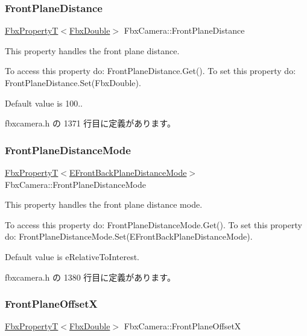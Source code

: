 \subsubsection{\texorpdfstring{Front\+Plane\+Distance}{FrontPlaneDistance}}
{\footnotesize\ttfamily \hyperlink{class_fbx_property_t}{Fbx\+PropertyT}$<$\hyperlink{fbxtypes_8h_a171e72a1c46fc15c1a6c9c31948c1c5b}{Fbx\+Double}$>$ Fbx\+Camera\+::\+Front\+Plane\+Distance}

This property handles the front plane distance.

To access this property do\+: Front\+Plane\+Distance.\+Get(). To set this property do\+: Front\+Plane\+Distance.\+Set(\+Fbx\+Double).

Default value is 100.. 

 fbxcamera.\+h の 1371 行目に定義があります。

\mbox{\label{class_fbx_camera_ac8275a3d73371ebdd381bec957820b14}} 
\subsubsection{\texorpdfstring{Front\+Plane\+Distance\+Mode}{FrontPlaneDistanceMode}}
{\footnotesize\ttfamily \hyperlink{class_fbx_property_t}{Fbx\+PropertyT}$<$\hyperlink{class_fbx_camera_a79e74898d117e741c3fbd10b1ef21c79}{E\+Front\+Back\+Plane\+Distance\+Mode}$>$ Fbx\+Camera\+::\+Front\+Plane\+Distance\+Mode}

This property handles the front plane distance mode.

To access this property do\+: Front\+Plane\+Distance\+Mode.\+Get(). To set this property do\+: Front\+Plane\+Distance\+Mode.\+Set(\+E\+Front\+Back\+Plane\+Distance\+Mode).

Default value is e\+Relative\+To\+Interest. 

 fbxcamera.\+h の 1380 行目に定義があります。

\mbox{\label{class_fbx_camera_ad15249c2dceb1d0cc2b5913c0efd9b18}} 
\subsubsection{\texorpdfstring{Front\+Plane\+OffsetX}{FrontPlaneOffsetX}}
{\footnotesize\ttfamily \hyperlink{class_fbx_property_t}{Fbx\+PropertyT}$<$\hyperlink{fbxtypes_8h_a171e72a1c46fc15c1a6c9c31948c1c5b}{Fbx\+Double}$>$ Fbx\+Camera\+::\+Front\+Plane\+OffsetX}

